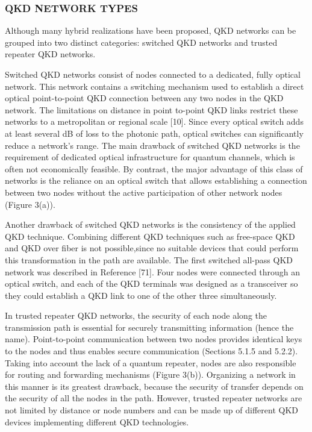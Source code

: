 \subsubsection{QKD NETWORK TYPES}
Although many hybrid realizations have been proposed, QKD networks can be grouped into two distinct categories: switched QKD networks and trusted repeater QKD networks.

Switched QKD networks consist of nodes connected to a dedicated, fully optical network. This network contains a switching mechanism used to establish a direct optical point-to-point QKD connection between any two nodes in the QKD network. The limitations on distance in point to-point QKD links restrict these networks to a metropolitan or regional scale [10]. Since every optical switch adds at least several dB of loss to the photonic path, optical switches can significantly reduce a network’s range.
The main drawback of switched QKD networks is the requirement of dedicated optical infrastructure for quantum channels, which is often not economically feasible. By contrast, the major advantage of this class of networks is the reliance on an optical switch that allows establishing a connection between two nodes without the active participation of other network nodes (Figure 3(a)).

Another drawback of switched QKD networks is the consistency of the applied QKD technique.
Combining different QKD techniques such as free-space QKD and QKD over fiber is not possible,since no suitable devices that could perform this transformation in the path are available. The first switched all-pass QKD network was described in Reference [71]. Four nodes were connected through an optical switch, and each of the QKD terminals was designed as a transceiver so they could establish a QKD link to one of the other three simultaneously.

In trusted repeater QKD networks, the security of each node along the transmission path is essential for securely transmitting information (hence the name). Point-to-point communication between two nodes provides identical keys to the nodes and thus enables secure communication (Sections 5.1.5 and 5.2.2). Taking into account the lack of a quantum repeater, nodes are also responsible for routing and forwarding mechanisms (Figure 3(b)). Organizing a network in this manner is its greatest drawback, because the security of transfer depends on the security of all the nodes in the path. However, trusted repeater networks are not limited by distance or node numbers and can be made up of different QKD devices implementing different QKD technologies.

